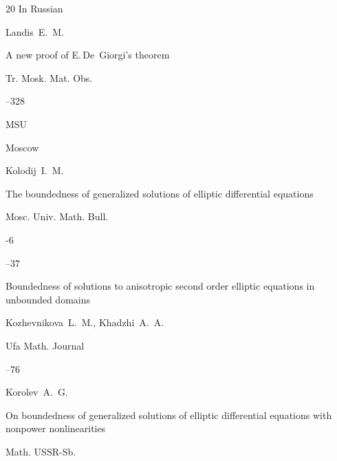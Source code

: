 \begin{thebibliography}{20}
\lang In Russian

\by Landis~E.~M.

\paper A new proof of E.\,De~Giorgi's theorem

\serial Tr. Mosk. Mat. Obs.



--328

\publ MSU

\publaddr Moscow






\by Kolodij~I.~M.

\paper The boundedness of generalized solutions of elliptic differential equations

\jour Mosc. Univ. Math. Bull.



-6

--37








\paper Boundedness of solutions to anisotropic second order elliptic equations in unbounded domains

\by Kozhevnikova~L.~M., Khadzhi~A.~A.

\jour Ufa Math. Journal




--76








\by Korolev~A.~G.

\paper On boundedness of generalized solutions of elliptic differential equations with nonpower nonlinearities

\jour Math. USSR-Sb.



\end{thebibliography}
